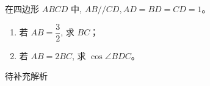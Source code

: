 \begin{prob}[source={2021八省联考}, topic={解三角形综合}]
在四边形 $ABCD$ 中, $AB//CD, AD=BD=CD=1$。
\begin{enumerate}
	\item[(1)] 若 $AB = \dfrac{3}{2}$, 求 $BC$；
	\item[(2)] 若 $AB = 2BC$, 求 $\cos\angle BDC$。
\end{enumerate}
\end{prob}
\begin{prob-sol}
待补充解析
\end{prob-sol}

